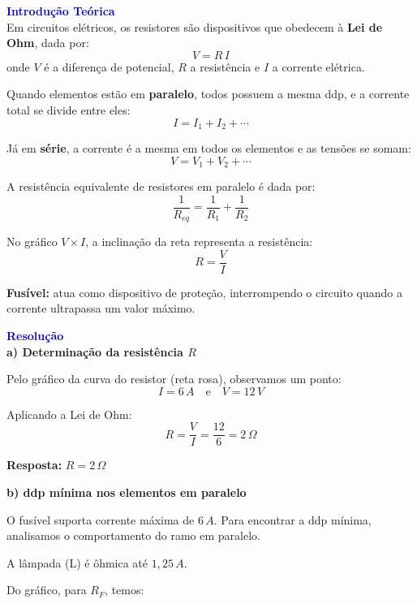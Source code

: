 \documentclass[a4paper,12pt]{article}
\title{}
\author{Andr\'e V. Silva}
\date{\today}
\begin{document}


\maketitle



\textbf{\textcolor{blue}{\Large Introdução Teórica}}\\

Em circuitos elétricos, os resistores são dispositivos que obedecem à \textbf{Lei de Ohm}, dada por:
\[
V = R\,I
\]
onde $V$ é a diferença de potencial, $R$ a resistência e $I$ a corrente elétrica.

Quando elementos estão em \textbf{paralelo}, todos possuem a mesma ddp, e a corrente total se divide entre eles:
\[
I = I_1 + I_2 + \cdots
\]

Já em \textbf{série}, a corrente é a mesma em todos os elementos e as tensões se somam:
\[
V = V_1 + V_2 + \cdots
\]

A resistência equivalente de resistores em paralelo é dada por:
\[
\frac{1}{R_{eq}} = \frac{1}{R_1} + \frac{1}{R_2}
\]

No gráfico $V \times I$, a inclinação da reta representa a resistência:
\[
R = \frac{V}{I}
\]

\textbf{Fusível:} atua como dispositivo de proteção, interrompendo o circuito quando a corrente ultrapassa um valor máximo.

\vspace{0.5cm}

\textbf{\textcolor{blue}{\Large Resolução}}\\

\textbf{a) Determinação da resistência $R$}

Pelo gráfico da curva do resistor (reta rosa), observamos um ponto:
\[
I = 6\,A \quad \text{e} \quad V = 12\,V
\]

Aplicando a Lei de Ohm:
\[
R = \frac{V}{I} = \frac{12}{6} = 2\,\Omega
\]

\textbf{Resposta:} $R = 2\,\Omega$

\vspace{0.5cm}

\textbf{b) ddp mínima nos elementos em paralelo}

O fusível suporta corrente máxima de $6\,A$. Para encontrar a ddp mínima, 
analisamos o comportamento do ramo em paralelo.

A lâmpada (L) é ôhmica até $1{,}25\,A$. 

Do gráfico, para $R_F$, temos:
\end{document}
